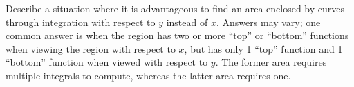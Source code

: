 {Describe a situation where it is advantageous to find an area enclosed by curves through integration with respect to $y$ instead of $x$.}
{Answers may vary; one common answer is when the region has two or more ``top'' or ``bottom'' functions when viewing the region with respect to $x$, but has only 1 ``top'' function and 1 ``bottom'' function when viewed with respect to $y$. The former area requires multiple integrals to compute, whereas the latter area requires one.}
